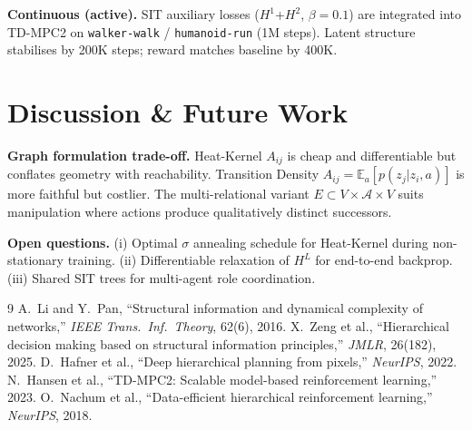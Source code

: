 \documentclass[10pt,twocolumn]{article}
\begin{document}
\smallskip
\noindent\textbf{Continuous (active).}
SIT auxiliary losses ($H^1$+$H^2$, $\beta\!=\!0.1$) are integrated into
TD-MPC2 on \texttt{walker-walk} / \texttt{humanoid-run} (1M steps).
Latent structure stabilises by 200K steps; reward matches baseline by 400K.

\section{Discussion \& Future Work}

\noindent\textbf{Graph formulation trade-off.}
Heat-Kernel $A_{ij}$ is cheap and differentiable but conflates geometry
with reachability.  Transition Density $A_{ij}=\mathbb{E}_a[p(z_j|z_i,a)]$
is more faithful but costlier.  The multi-relational variant
$E\!\subset\!V\!\times\!\mathcal{A}\!\times\!V$ suits manipulation where
actions produce qualitatively distinct successors.

\smallskip
\noindent\textbf{Open questions.}
(i) Optimal $\sigma$ annealing schedule for Heat-Kernel during
non-stationary training.
(ii) Differentiable relaxation of $H^L$ for end-to-end backprop.
(iii) Shared SIT trees for multi-agent role coordination.

\begin{thebibliography}{9}
  A.~Li and Y.~Pan, ``Structural information and dynamical complexity of
  networks,'' \textit{IEEE Trans.\ Inf.\ Theory}, 62(6), 2016.
  X.~Zeng et al., ``Hierarchical decision making based on structural
  information principles,'' \textit{JMLR}, 26(182), 2025.
  D.~Hafner et al., ``Deep hierarchical planning from pixels,''
  \textit{NeurIPS}, 2022.
  N.~Hansen et al., ``TD-MPC2: Scalable model-based reinforcement
  learning,'' 2023.
  O.~Nachum et al., ``Data-efficient hierarchical reinforcement
  learning,'' \textit{NeurIPS}, 2018.
\end{thebibliography}
\end{document}
